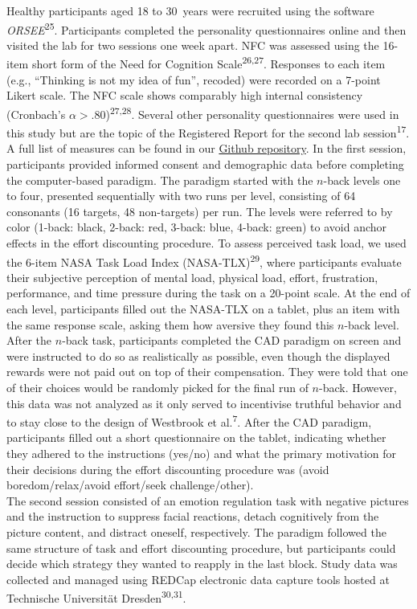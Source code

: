 \documentclass[
  man,floatsintext]{apa6}
\begin{document}
Healthy participants aged 18 to 30~years were recruited using the software \emph{ORSEE}\textsuperscript{25}.
Participants completed the personality questionnaires online and then visited the lab for two sessions one week apart.
NFC was assessed using the 16-item short form of the Need for Cognition Scale\textsuperscript{26,27}.
Responses to each item (e.g., ``Thinking is not my idea of fun'', recoded) were recorded on a 7-point Likert scale.
The NFC scale shows comparably high internal consistency (Cronbach's \(\alpha>.80\))\textsuperscript{27,28}.
Several other personality questionnaires were used in this study but are the topic of the Registered Report for the second lab session\textsuperscript{17}.
A full list of measures can be found in our \href{https://github.com/ChScheffel/CAD}{Github repository}.
In the first session, participants provided informed consent and demographic data before completing the computer-based paradigm.
The paradigm started with the \(n\)-back levels one to four, presented sequentially with two runs per level, consisting of 64 consonants (16 targets, 48 non-targets) per run.
The levels were referred to by color (1-back: black, 2-back: red, 3-back: blue, 4-back: green) to avoid anchor effects in the effort discounting procedure.
To assess perceived task load, we used the 6-item NASA Task Load Index (NASA-TLX)\textsuperscript{29}, where participants evaluate their subjective perception of mental load, physical load, effort, frustration, performance, and time pressure during the task on a 20-point scale.
At the end of each level, participants filled out the NASA-TLX on a tablet, plus an item with the same response scale, asking them how aversive they found this \(n\)-back level.
After the \(n\)-back task, participants completed the CAD paradigm on screen and were instructed to do so as realistically as possible, even though the displayed rewards were not paid out on top of their compensation.
They were told that one of their choices would be randomly picked for the final run of \(n\)-back.
However, this data was not analyzed as it only served to incentivise truthful behavior and to stay close to the design of Westbrook et al.\textsuperscript{7}.
After the CAD paradigm, participants filled out a short questionnaire on the tablet, indicating whether they adhered to the instructions (yes/no) and what the primary motivation for their decisions during the effort discounting procedure was (avoid boredom/relax/avoid effort/seek challenge/other).\\
The second session consisted of an emotion regulation task with negative pictures and the instruction to suppress facial reactions, detach cognitively from the picture content, and distract oneself, respectively.
The paradigm followed the same structure of task and effort discounting procedure, but participants could decide which strategy they wanted to reapply in the last block.
Study data was collected and managed using REDCap electronic data capture tools hosted at Technische Universität Dresden\textsuperscript{30,31}.
\end{document}
